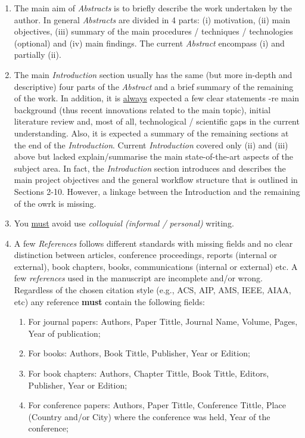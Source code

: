 \documentclass[14pt,twoside]{report}
\begin{document}
\begin{enumerate}
%
\item The main aim of {\it Abstracts} is to briefly describe the work undertaken by the author. In general {\it Abstracts} are divided in 4 parts: (i) motivation, (ii) main objectives, (iii) summary of the main procedures / techniques / technologies (optional) and (iv) main findings. The current {\it Abstract} encompass (i) and partially (ii). 
%
\item The main {\it Introduction} section usually has the same (but more in-depth and descriptive) four parts of the {\it Abstract} and a brief summary of the remaining of the work. In addition, it is \underline{always} expected a few clear statements -re main background (thus recent innovations related to the main topic), initial literature review and, most of all, technological / scientific gaps in the current understanding. Also, it is expected a summary of the remaining sections at the end of the {\it Introduction}.  Current {\it Introduction} covered only (ii) and (iii) above but lacked explain/summarise the main state-of-the-art aspects of the subject area. In fact, the {\it Introduction} section introduces and describes the main project objectives and the general workflow structure that is outlined in Sections 2-10. However, a linkage between the Introduction and the remaining of the owrk is missing.
%
\item You \underline{must} avoid use {\it colloquial (informal / personal)} writing.  
%
\item A few {\it References} follows different standards with missing fields and no clear distinction between articles, conference proceedings, reports (internal or external), book chapters, books, communications (internal or external) etc.  A few {\it references} used in the manuscript are incomplete and/or wrong. Regardless of the chosen citation style (e.g., ACS, AIP, AMS, IEEE, AIAA, etc) any reference {\bf must} contain the following fields: 
\begin{enumerate}
\item For journal papers: Authors, Paper Tittle, Journal Name, Volume, Pages, Year of publication;
\item For books: Authors, Book Tittle, Publisher, Year or Edition;
\item For book chapters: Authors, Chapter Tittle, Book Tittle, Editors, Publisher, Year or Edition;
\item For conference papers: Authors, Paper Tittle, Conference Tittle, Place (Country and/or City) where the conference was held, Year of the conference;

\end{enumerate}
\end{enumerate}
\end{document}
